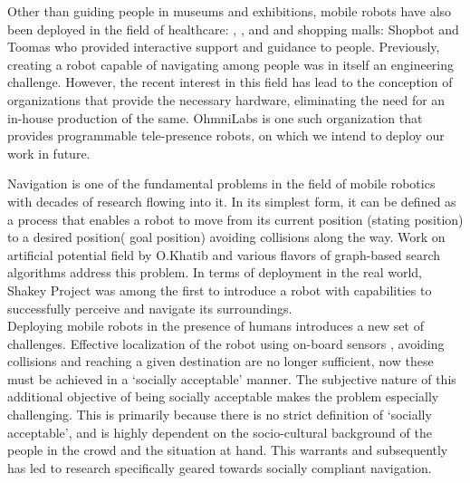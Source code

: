 Other than guiding people in museums and exhibitions, mobile robots have also been deployed in the field of healthcare: \cite{pearl_pollack_2002}, \cite{kim_socially_2016}, and \cite{kuderer_feature-based_nodate} and shopping malls: Shopbot \cite{shopbot_kanada} and Toomas \cite{toomas_gross_2009} who provided interactive support and guidance to people. Previously, creating a robot capable of navigating among people was in itself an engineering challenge. However, the recent interest in this field has lead to the conception of organizations that provide the necessary hardware, eliminating the need for an in-house production of the same. OhmniLabs is one such organization that provides programmable tele-presence robots, on which we intend to deploy our work in future.  



Navigation is one of the fundamental problems in the field of mobile robotics with decades of research flowing into it. In its simplest form, it can be defined as a process that enables a robot to move from its current position (stating position) to a desired position( goal position) avoiding collisions along the way. Work on artificial potential field by O.Khatib \cite{khatib_1986} and various flavors of graph-based search algorithms address this problem. In terms of deployment in the real world, Shakey Project \cite{project-shakey} was among the first to introduce a robot with capabilities to successfully perceive and navigate its surroundings.\\

Deploying mobile robots in the presence of humans introduces a new set of challenges. Effective localization of the robot using on-board sensors \cite{REKLEITIS2006921}, avoiding collisions and reaching a given destination are no longer sufficient, now these must be achieved in a `socially acceptable' manner. The subjective nature of this additional objective of being socially acceptable makes the problem especially challenging. This is primarily because there is no strict definition of `socially acceptable', and is highly dependent on the socio-cultural background of the people in the crowd and the situation at hand. This warrants and subsequently has led to research specifically geared towards socially compliant navigation.\\

